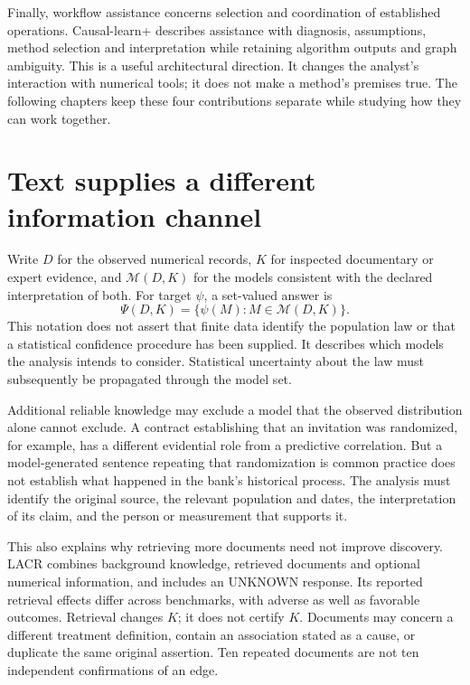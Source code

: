 Finally, workflow assistance concerns selection and coordination of established
operations. Causal-learn+ describes assistance with diagnosis, assumptions,
method selection and interpretation while retaining algorithm outputs and
graph ambiguity.\cite{v12_la_2606_23608} This is a useful architectural direction.
It changes the analyst's interaction with numerical tools; it does not make a
method's premises true. The following chapters keep these four contributions
separate while studying how they can work together.

\section{Text supplies a different information channel}

Write $D$ for the observed numerical records, $K$ for inspected documentary or
expert evidence, and $\mathcal M(D,K)$ for the models consistent with the
declared interpretation of both. For target $\psi$, a set-valued answer is
\[
 \Psi(D,K)=\{\psi(M):M\in\mathcal M(D,K)\}.
\]
This notation does not assert that finite data identify the population law or
that a statistical confidence procedure has been supplied. It describes which
models the analysis intends to consider. Statistical uncertainty about the law
must subsequently be propagated through the model set.

Additional reliable knowledge may exclude a model that the observed distribution
alone cannot exclude. A contract establishing that an invitation was randomized,
for example, has a different evidential role from a predictive correlation.
But a model-generated sentence repeating that randomization is common practice
does not establish what happened in the bank's historical process. The analysis
must identify the original source, the relevant population and dates, the
interpretation of its claim, and the person or measurement that supports it.

This also explains why retrieving more documents need not improve discovery.
LACR combines background knowledge, retrieved documents and optional numerical
information, and includes an UNKNOWN response. Its reported retrieval effects
differ across benchmarks, with adverse as well as favorable outcomes.
\cite{v12_la_2402_15301} Retrieval changes $K$; it does not certify $K$. Documents
may concern a different treatment definition, contain an association stated as
a cause, or duplicate the same original assertion. Ten repeated documents are
not ten independent confirmations of an edge.

